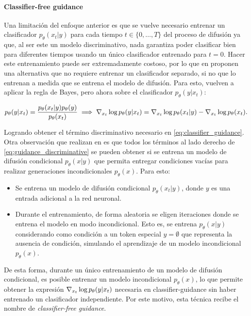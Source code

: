 \paragraph{Classifier-free guidance}

Una limitación del enfoque anterior es que se vuelve necesario entrenar un clasificador $p_\theta(x_t|y)$ para cada tiempo $t\in\{0,\ldots,T\}$ del proceso de difusión ya que, al ser este un modelo discriminativo, nada garantiza poder clasificar bien para diferentes tiempos usando un único clasificador entrenado para $t=0$. Hacer este entrenamiento puede ser extremadamente costoso, por lo que en \cite{ho2022classifierfreediffusionguidance} proponen una alternativa que no requiere entrenar un clasificador separado, si no que lo entrenan a medida que se entrena el modelo de difusión. Para esto, vuelven a aplicar la regla de Bayes, pero ahora sobre el clasificador $p_\theta(y|x_t)$:

\begin{equation}
    \label{eq:guidance_discriminative}
    p_\theta(y|x_t) = \frac{p_\theta(x_t|y)p_\theta(y)}{p_\theta(x_t)}
    \implies
    \nabla_{x_t} \log p_\theta(y|x_t) = \nabla_{x_t} \log p_\theta(x_t|y) - \nabla_{x_t} \log p_\theta(x_t).
\end{equation}

Logrando obtener el término discriminativo necesario en \eqref{eq:classifier_guidance}. Otra observación que realizan en \cite{ho2022classifierfreediffusionguidance} es que todos los términos al lado derecho de \eqref{eq:guidance_discriminative} se pueden obtener si se entrena un modelo de difusión condicional $p_\theta(x|y)$ que permita entregar condiciones vacías para realizar generaciones incondicionales $p_\theta(x)$. Para esto:

\begin{itemize}
    \item Se entrena un modelo de difusión condicional $p_\theta(x_t|y)$, donde $y$ es una entrada adicional a la red neuronal.
    \item Durante el entrenamiento, de forma aleatoria se eligen iteraciones donde se entrena el modelo en modo incondicional. Esto es, se entrena $p_\theta(x|y)$ considerando como condición a un token especial $y=\emptyset$ que representa la ausencia de condición, simulando el aprendizaje de un modelo incondicional $p_\theta(x)$.
\end{itemize}

De esta forma, durante un único entrenamiento de un modelo de difusión condicional, es posible entrenar un modelo incondicional $p_\theta(x)$, lo que permite obtener la expresión $\nabla_{x_t} \log p_\theta(y|x_t)$ necesaria en classifier-guidance sin haber entrenado un clasificador independiente. Por este motivo, esta técnica recibe el nombre de \textit{classifier-free guidance}.

